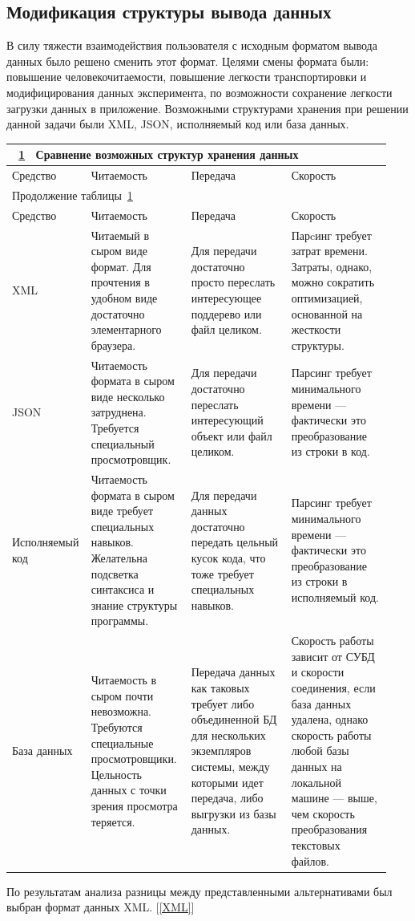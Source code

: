 \documentclass[utf8,usehyperref,14pt]{G7-32}
\begin{document}
\subsection{Модификация структуры вывода данных}
\par{\normalsize В силу тяжести взаимодействия пользователя с исходным форматом вывода данных было решено сменить этот формат. Целями смены формата были: повышение человекочитаемости, повышение легкости транспортировки и модифицирования данных эксперимента, по возможности сохранение легкости загрузки данных в приложение.
Возможными структурами хранения при решении данной задачи были XML, JSON, исполняемый код или база данных.}
\begin{longtable}{|p{0.16\linewidth}|p{0.26\linewidth}|p{0.26\linewidth}|p{0.26\linewidth}|}
\multicolumn{4}{l}{\tablename~\ref{T:Ta} ~Сравнение возможных структур хранения данных \label{T:Ta}}\\
\hline
Средство & Читаемость & Передача & Скорость \\
\hline
\endfirsthead
\multicolumn{4}{l}{Продолжение таблицы~\ref{T:Ta}}\\
\hline
Средство & Читаемость & Передача & Скорость \\
\hline
\endhead\small
XML & Читаемый в сыром виде формат. Для прочтения в удобном виде достаточно элементарного браузера. & Для передачи достаточно просто переслать интересующее поддерево или файл целиком. & Парcинг требует затрат времени. Затраты, однако, можно сократить оптимизацией, основанной на жесткости структуры.   \\ \hline
JSON & Читаемость формата в сыром виде несколько затруднена. Требуется специальный просмотровщик. & Для передачи достаточно переслать интересующий объект или файл целиком. & Парсинг требует минимального времени --- фактически это преобразование из строки в код. \\ \hline
Исполняемый код & Читаемость формата в сыром виде требует специальных навыков. Желательна подсветка синтаксиса и знание структуры программы. & Для передачи данных достаточно передать цельный кусок кода, что тоже требует специальных навыков. & Парсинг требует минимального времени --- фактически это преобразование из строки в исполняемый код. \\ \hline
База данных &
Читаемость в сыром почти невозможна. Требуются специальные просмотровщики. Цельность данных с точки зрения просмотра теряется. &
Передача данных как таковых требует либо объединенной БД для нескольких экземпляров системы, между которыми идет передача, либо выгрузки из базы данных. &
Скорость работы зависит от СУБД и скорости соединения, если база данных удалена, однако скорость работы любой базы данных на локальной машине --- выше, чем скорость преобразования текстовых файлов. \\ 
\hline
\end{longtable}
\normalsize
По результатам анализа разницы между представленными альтернативами был выбран формат данных XML. [\ref{XML}]
\end{document}

